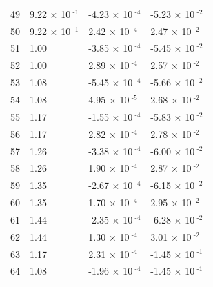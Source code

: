 \documentclass[a4paper,11pt]{article}
\begin{document}
\begin{center}
\begin{longtable}{|R{1.5cm}|R{2.5cm}|R{2.5cm}|R{2.5cm}|}
   49 &         9.22 $\times$ 10$^{\text{          -1}}$  &        -4.23 $\times$ 10$^{\text{          -4}}$  &        -5.23 $\times$ 10$^{\text{          -2}}$ \\ 
   50 &         9.22 $\times$ 10$^{\text{          -1}}$  &         2.42 $\times$ 10$^{\text{          -4}}$  &         2.47 $\times$ 10$^{\text{          -2}}$ \\ 
   51 &   1.00  &        -3.85 $\times$ 10$^{\text{          -4}}$  &        -5.45 $\times$ 10$^{\text{          -2}}$ \\ 
   52 &   1.00  &         2.89 $\times$ 10$^{\text{          -4}}$  &         2.57 $\times$ 10$^{\text{          -2}}$ \\ 
   53 &   1.08  &        -5.45 $\times$ 10$^{\text{          -4}}$  &        -5.66 $\times$ 10$^{\text{          -2}}$ \\ 
   54 &   1.08  &         4.95 $\times$ 10$^{\text{          -5}}$  &         2.68 $\times$ 10$^{\text{          -2}}$ \\ 
   55 &   1.17  &        -1.55 $\times$ 10$^{\text{          -4}}$  &        -5.83 $\times$ 10$^{\text{          -2}}$ \\ 
   56 &   1.17  &         2.82 $\times$ 10$^{\text{          -4}}$  &         2.78 $\times$ 10$^{\text{          -2}}$ \\ 
   57 &   1.26  &        -3.38 $\times$ 10$^{\text{          -4}}$  &        -6.00 $\times$ 10$^{\text{          -2}}$ \\ 
   58 &   1.26  &         1.90 $\times$ 10$^{\text{          -4}}$  &         2.87 $\times$ 10$^{\text{          -2}}$ \\ 
   59 &   1.35  &        -2.67 $\times$ 10$^{\text{          -4}}$  &        -6.15 $\times$ 10$^{\text{          -2}}$ \\ 
   60 &   1.35  &         1.70 $\times$ 10$^{\text{          -4}}$  &         2.95 $\times$ 10$^{\text{          -2}}$ \\ 
   61 &   1.44  &        -2.35 $\times$ 10$^{\text{          -4}}$  &        -6.28 $\times$ 10$^{\text{          -2}}$ \\ 
   62 &   1.44  &         1.30 $\times$ 10$^{\text{          -4}}$  &         3.01 $\times$ 10$^{\text{          -2}}$ \\ 
   63 &   1.17  &         2.31 $\times$ 10$^{\text{          -4}}$  &        -1.45 $\times$ 10$^{\text{          -1}}$ \\ 
   64 &   1.08  &        -1.96 $\times$ 10$^{\text{          -4}}$  &        -1.45 $\times$ 10$^{\text{          -1}}$ \\ 

\end{longtable}
\end{center}
\end{document}
